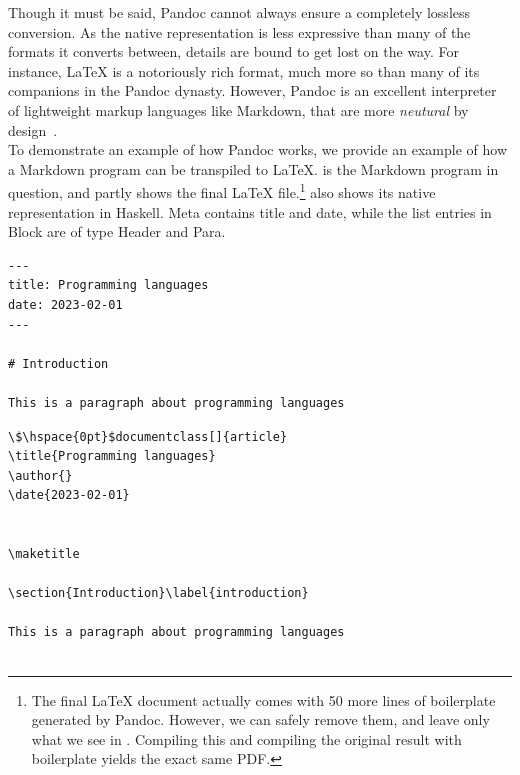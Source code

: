 Though it must be said, Pandoc cannot always ensure a completely lossless conversion. As the native representation is less expressive than many of the formats it converts between, details are bound to get lost on the way. For instance, LaTeX is a notoriously rich format, much more so than many of its companions in the Pandoc dynasty. However, Pandoc is an excellent interpreter of lightweight markup languages like Markdown, that are more \textit{neutural} by design~\cite{whatIsPandoc}. \\

To demonstrate an example of how Pandoc works, we provide an example of how a Markdown program can be transpiled to LaTeX.  is the Markdown program in question, and  partly shows the final LaTeX file.\footnote{The final LaTeX document actually comes with 50 more lines of boilerplate generated by Pandoc. However, we can safely remove them, and leave only what we see in . Compiling this and compiling the original result with boilerplate yields the exact same PDF.}  also shows its native representation in Haskell. Meta contains title and date, while the list entries in Block are of type Header and Para. \\

\begin{lstlisting}[caption={A program written in Markdown.}, captionpos=b, label={markdownProgram}]
---
title: Programming languages
date: 2023-02-01
---

# Introduction

This is a paragraph about programming languages

\end{lstlisting}

\begin{lstlisting}[caption={The result of transpiling \Cref{markdownProgram} to LaTeX.}, captionpos=b, label={pandocLatex}]
\$\hspace{0pt}$documentclass[]{article}
\title{Programming languages}
\author{}
\date{2023-02-01}


\maketitle

\section{Introduction}\label{introduction}

This is a paragraph about programming languages


\end{lstlisting}

